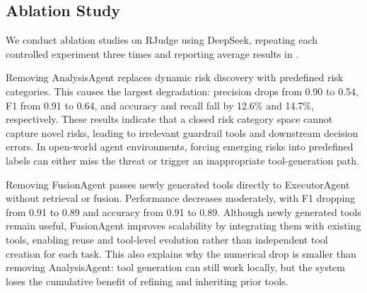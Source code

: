 \subsection{Ablation Study}
\label{subsec:ablation_study}


We conduct ablation studies on RJudge using DeepSeek, repeating each controlled experiment three times and reporting average results in .

 Removing AnalysisAgent replaces dynamic risk discovery with predefined risk categories. This causes the largest degradation: precision drops from 0.90 to 0.54, F1 from 0.91 to 0.64, and accuracy and recall fall by 12.6\% and 14.7\%, respectively. These results indicate that a closed risk category space cannot capture novel risks, leading to irrelevant guardrail tools and downstream decision errors. In open-world agent environments, forcing emerging risks into predefined labels can either miss the threat or trigger an inappropriate tool-generation path.

 Removing FusionAgent passes newly generated tools directly to ExecutorAgent without retrieval or fusion. Performance decreases moderately, with F1 dropping from 0.91 to 0.89 and accuracy from 0.91 to 0.89. Although newly generated tools remain useful, FusionAgent improves scalability by integrating them with existing tools, enabling reuse and tool-level evolution rather than independent tool creation for each task. This also explains why the numerical drop is smaller than removing AnalysisAgent: tool generation can still work locally, but the system loses the cumulative benefit of refining and inheriting prior tools.

